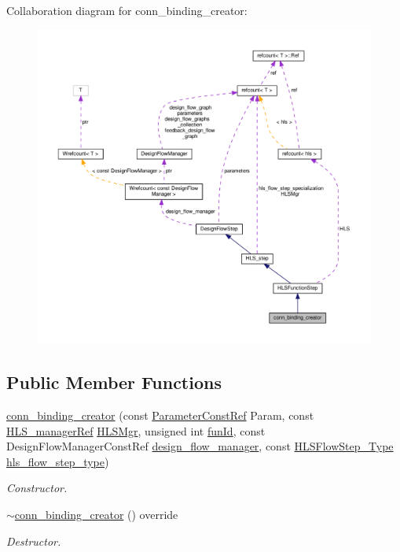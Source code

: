 Collaboration diagram for conn\+\_\+binding\+\_\+creator\+:
\nopagebreak
\begin{figure}[H]
\begin{center}
\leavevmode
\includegraphics[width=350pt]{d4/dca/classconn__binding__creator__coll__graph}
\end{center}
\end{figure}
\subsection*{Public Member Functions}
\begin{DoxyCompactItemize}
\item 
\hyperlink{classconn__binding__creator_a09179684d2f2d0c46a0dc248321cfdaf}{conn\+\_\+binding\+\_\+creator} (const \hyperlink{Parameter_8hpp_a37841774a6fcb479b597fdf8955eb4ea}{Parameter\+Const\+Ref} Param, const \hyperlink{hls__manager_8hpp_acd3842b8589fe52c08fc0b2fcc813bfe}{H\+L\+S\+\_\+manager\+Ref} \hyperlink{classHLS__step_ade85003a99d34134418451ddc46a18e9}{H\+L\+S\+Mgr}, unsigned int \hyperlink{classHLSFunctionStep_a3e6434fd86c698b0c70520b859bff5b0}{fun\+Id}, const Design\+Flow\+Manager\+Const\+Ref \hyperlink{classDesignFlowStep_ab770677ddf087613add30024e16a5554}{design\+\_\+flow\+\_\+manager}, const \hyperlink{hls__step_8hpp_ada16bc22905016180e26fc7e39537f8d}{H\+L\+S\+Flow\+Step\+\_\+\+Type} \hyperlink{classHLS__step_aefd59af15346ec3f10bf12bd756e6777}{hls\+\_\+flow\+\_\+step\+\_\+type})
\begin{DoxyCompactList}\small\item\em Constructor. \end{DoxyCompactList}\item 
\hyperlink{classconn__binding__creator_afb5c0a1ec11cfa1523842efbbe44aa4e}{$\sim$conn\+\_\+binding\+\_\+creator} () override
\begin{DoxyCompactList}\small\item\em Destructor. \end{DoxyCompactList}\end{DoxyCompactItemize}
